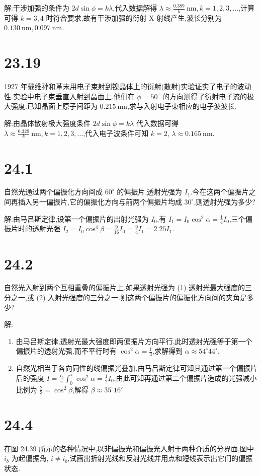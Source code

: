     解:干涉加强的条件为 $2d\sin\phi=k\lambda$,代入数据解得 $\lambda\approx \frac{0.389}{k} \ \mathrm{nm},k=1,2,3,\ldots$,计算可得 $k=3,4$ 时符合要求,故有干涉加强的衍射 X 射线产生,波长分别为 $0.130 \ \mathrm{nm},0.097 \ \mathrm{nm}$.
    \section{23.19} 1927 年戴维孙和革末用电子束射到镍晶体上的衍射(散射)实验证实了电子的波动性.实验中电子束垂直入射到晶面上.他们在 $\phi=50^{\circ}$ 的方向测得了衍射电子流的极大强度.已知晶面上原子间距为 $0.215 \ \mathrm{nm}$,求与入射电子束相应的电子波波长.

    解:由晶体散射极大强度条件 $2d\sin \phi=k\lambda$ 代入数据可得 $\lambda\approx \frac{0.329}{k} \ \mathrm{nm},k=1,2,3,\ldots$,代入电子波条件可知 $k=2$, $\lambda\approx 0.165 \ \mathrm{ nm}$.
    \section{24.1} 自然光通过两个偏振化方向间成 $60^{\circ}$ 的偏振片,透射光强为 $I_1$.今在这两个偏振片之间再插入另一偏振片,它的偏振化方向与前两个偏振片均成 $30^{\circ}$,则透射光强为多少?

    解:由马吕斯定律,设第一个偏振片的出射光强为 $I_0$,有 $I_1=I_0\cos ^2\alpha=\frac{1}{4}I_0$,三个偏振片时的透射光强 $I_2=I_0\cos ^{4}\beta=\frac{9}{16}I_0=\frac{9}{4}I_1=2.25I_1$.
    \section{24.2} 自然光入射到两个互相重叠的偏振片上.如果透射光强为 (1) 透射光最大强度的三分之一,或 (2) 入射光强度的三分之一.则这两个偏振片的偏振化方向间的夹角是多少?

    解:
    \begin{enumerate}
        \item 由马吕斯定律,透射光最大强度即两偏振片方向平行,此时透射光强等于第一个偏振片的透射光强,而不平行时有 $\cos ^2\alpha=\frac{1}{3}$,求解得到 $\alpha\approx 54^{\circ}44'$.
        \item 自然光相当于各向同性的线偏振光叠加,由马吕斯定律可知其通过第一个偏振片后的强度 $I=\frac{I_0}{\pi}\int_{0}^{\pi}\cos ^2\alpha=\frac{1}{2}I_0$,由此可知再通过第二个偏振片造成的光强减小比例为 $\frac{2}{3}=\cos ^2\beta$,解得 $\beta\approx 35^{\circ}16'$.
    \end{enumerate}
    \section{24.4} 在图 24.39 所示的各种情况中,以非偏振光和偏振光入射于两种介质的分界面,图中 $i_{b}$ 为起偏振角, $i\ne i_{b}$,试画出折射光线和反射光线并用点和短线表示出它们的偏振状态.

